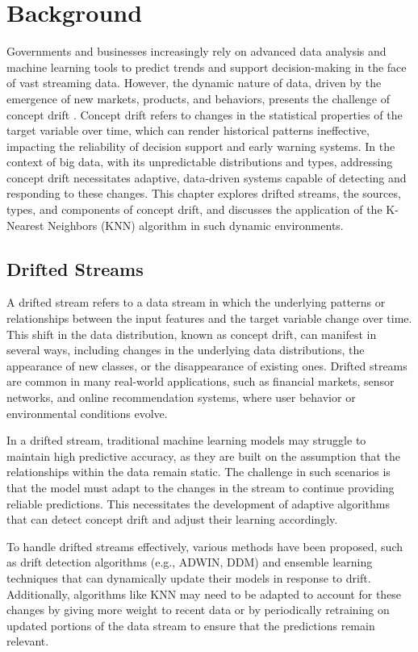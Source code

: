 \chapter{Background}\label{cha:2_background}
Governments and businesses increasingly rely on advanced data analysis and machine learning tools to predict trends and support decision-making in the face of vast streaming data. However, the dynamic nature of data, driven by the emergence of new markets, products, and behaviors, presents the challenge of concept drift \cite{widmer1996learning}. Concept drift refers to changes in the statistical properties of the target variable over time, which can render historical patterns ineffective, impacting the reliability of decision support and early warning systems. In the context of big data, with its unpredictable distributions and types, addressing concept drift necessitates adaptive, data-driven systems capable of detecting and responding to these changes. This chapter explores drifted streams, the sources, types, and components of concept drift, and discusses the application of the K-Nearest Neighbors (KNN) algorithm in such dynamic environments.
\section{Drifted Streams}
A drifted stream refers to a data stream in which the underlying patterns or relationships between the input features and the target variable change over time. This shift in the data distribution, known as concept drift, can manifest in several ways, including changes in the underlying data distributions, the appearance of new classes, or the disappearance of existing ones. Drifted streams are common in many real-world applications, such as financial markets, sensor networks, and online recommendation systems, where user behavior or environmental conditions evolve.

In a drifted stream, traditional machine learning models may struggle to maintain high predictive accuracy, as they are built on the assumption that the relationships within the data remain static. The challenge in such scenarios is that the model must adapt to the changes in the stream to continue providing reliable predictions. This necessitates the development of adaptive algorithms that can detect concept drift and adjust their learning accordingly.

To handle drifted streams effectively, various methods have been proposed, such as drift detection algorithms (e.g., ADWIN, DDM) and ensemble learning techniques that can dynamically update their models in response to drift. Additionally, algorithms like KNN may need to be adapted to account for these changes by giving more weight to recent data or by periodically retraining on updated portions of the data stream to ensure that the predictions remain relevant.
